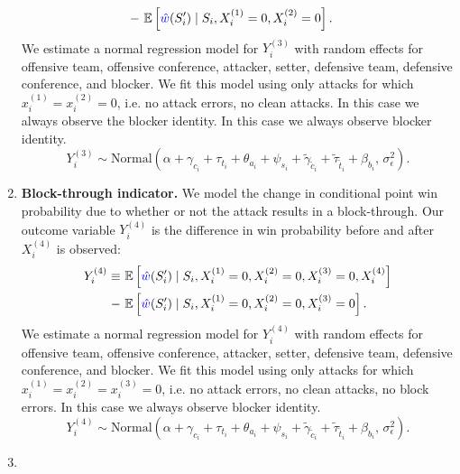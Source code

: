 \documentclass[USenglish]{article}
\theoremstyle{dgthm}
\theoremstyle{dgdef}
\begin{document}
\begin{enumerate}
\begin{align*}
            - &~\mathbb{E}\left[\textcolor{blue}{\hat w}(S'_i) \mid S_i, X_i^{(1)} = 0, X_i^{(2)} = 0\right].
        \end{align*}
        We estimate a normal regression model for $Y_i^{(3)}$ with random effects for offensive team, offensive conference, attacker, setter, defensive team, defensive conference, and blocker. We fit this model using only attacks for which $x_i^{(1)} = x_i^{(2)} = 0$, i.e. no attack errors, no clean attacks. In this case we always observe the blocker identity. In this case we always observe blocker identity.
        \begin{equation}
        \label{eqn:attack-model-3}
            Y_i^{(3)} \sim \mbox{Normal}\left(
                \alpha + \gamma_{c_i} + \tau_{t_i} + \theta_{a_i} + \psi_{s_i} + \tilde\gamma_{\tilde c_i} + \tilde\tau_{\tilde t_i} + \beta_{b_i},\,
                \sigma^2_\epsilon
            \right).
        \end{equation}
    \item
        {\bf Block-through indicator.} We model the change in conditional point win probability due to whether or not the attack results in a block-through. Our outcome variable $Y_i^{(4)}$ is the difference in win probability before and after $X_i^{(4)}$ is observed:
        \begin{align*}
            Y_i^{(4)} \equiv &~\mathbb{E}\left[\textcolor{blue}{\hat w}(S'_i) \mid S_i, X_i^{(1)} = 0, X_i^{(2)} = 0, X_i^{(3)} = 0, X_i^{(4)}\right]\\
            - &~\mathbb{E}\left[\textcolor{blue}{\hat w}(S'_i) \mid S_i, X_i^{(1)} = 0, X_i^{(2)} = 0, X_i^{(3)} = 0\right].
        \end{align*}
        We estimate a normal regression model for $Y_i^{(4)}$ with random effects for offensive team, offensive conference, attacker, setter, defensive team, defensive conference, and blocker. We fit this model using only attacks for which $x_i^{(1)} = x_i^{(2)} = x_i^{(3)} = 0$, i.e. no attack errors, no clean attacks, no block errors. In this case we always observe blocker identity.
        \begin{equation}
        \label{eqn:attack-model-4}
            Y_i^{(4)} \sim \mbox{Normal}\left(
                \alpha + \gamma_{c_i} + \tau_{t_i} + \theta_{a_i} + \psi_{s_i} + \tilde\gamma_{\tilde c_i} + \tilde\tau_{\tilde t_i} + \beta_{b_i},\,
                \sigma^2_\epsilon
            \right).
        \end{equation}
    \item

\end{enumerate}
\end{document}
